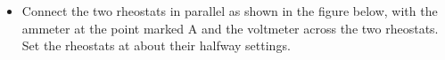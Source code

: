 \begin{itemize}
\item Connect the two rheostats in parallel as shown in the figure below,
with the ammeter at the point marked A and the voltmeter across the
two rheostats. Set the rheostats at about their halfway settings.
\end{itemize}
\vspace{0.3cm}
{\centering {} \par}
\vspace{0.3cm}

